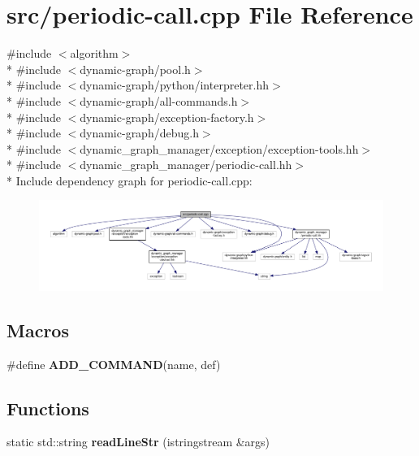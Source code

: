 \hypertarget{periodic-call_8cpp}{}\section{src/periodic-\/call.cpp File Reference}
\label{periodic-call_8cpp}
{\ttfamily \#include $<$algorithm$>$}\\*
{\ttfamily \#include $<$dynamic-\/graph/pool.\+h$>$}\\*
{\ttfamily \#include $<$dynamic-\/graph/python/interpreter.\+hh$>$}\\*
{\ttfamily \#include $<$dynamic-\/graph/all-\/commands.\+h$>$}\\*
{\ttfamily \#include $<$dynamic-\/graph/exception-\/factory.\+h$>$}\\*
{\ttfamily \#include $<$dynamic-\/graph/debug.\+h$>$}\\*
{\ttfamily \#include $<$dynamic\+\_\+graph\+\_\+manager/exception/exception-\/tools.\+hh$>$}\\*
{\ttfamily \#include $<$dynamic\+\_\+graph\+\_\+manager/periodic-\/call.\+hh$>$}\\*
Include dependency graph for periodic-\/call.cpp\+:
\nopagebreak
\begin{figure}[H]
\begin{center}
\leavevmode
\includegraphics[width=350pt]{periodic-call_8cpp__incl}
\end{center}
\end{figure}
\subsection*{Macros}
\begin{DoxyCompactItemize}
\item 
\#define {\bfseries A\+D\+D\+\_\+\+C\+O\+M\+M\+A\+ND}(name,  def)
\end{DoxyCompactItemize}
\subsection*{Functions}
\begin{DoxyCompactItemize}
\item 
static std\+::string {\bfseries read\+Line\+Str} (istringstream \&args)\hypertarget{periodic-call_8cpp_af4062bc26c8f63ecd9875f2dd95aac9c}{}\label{periodic-call_8cpp_af4062bc26c8f63ecd9875f2dd95aac9c}

\end{DoxyCompactItemize}


